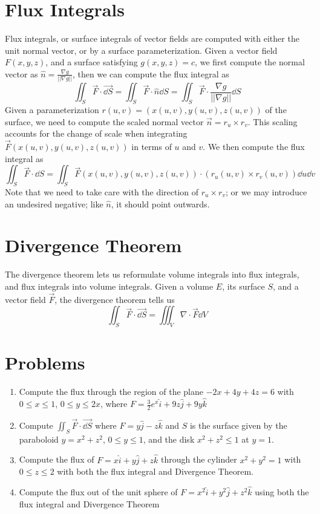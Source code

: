 \documentclass[letterpaper,11pt]{article}
\begin{document}
\section*{Flux Integrals}
Flux integrals, or surface integrals of vector fields are computed with either the unit normal vector, or by a surface parameterization.
Given a vector field $F(x, y, z)$, and a surface satisfying $g(x, y, z) = c$, we first compute the normal vector as
$\hat{n} = \frac{\nabla g}{||\nabla g||}$, then we can compute the flux integral as
$$
\iint_S \vec{F} \cdot \vec{\dd{S}} = \iint_S \vec{F} \cdot \hat{n} \dd{S} = \iint_S \vec{F} \cdot \frac{\nabla g}{||\nabla g||} \dd{S}
$$
Given a parameterization $r(u, v) = (x(u, v), y(u, v), z(u, v))$ of the surface, we need to compute the scaled normal vector
$\vec{n} = r_u \times r_v$.
This scaling accounts for the change of scale when integrating $\vec{F}(x(u, v), y(u, v), z(u, v))$ in terms of $u$ and $v$.
We then compute the flux integral as
$$
\iint_S \vec{F} \cdot \dd{S} = \iint_S \vec{F}(x(u, v), y(u, v), z(u, v)) \cdot (r_u(u, v) \times r_v(u, v)) \dd{u} \dd{v}
$$
Note that we need to take care with the direction of $r_u \times r_v$; or we may introduce an undesired negative;
like $\hat{n}$, it should point outwards.

\section*{Divergence Theorem}
The divergence theorem lets us reformulate volume integrals into flux integrals, and flux integrals into volume integrals.
Given a volume $E$, its surface $S$, and a vector field $\vec{F}$, the divergence theorem tells us
$$
\iint_S \vec{F} \cdot \vec{\dd{S}} = \iiint_V \nabla \cdot \vec{F} \dd{V}
$$
\section*{Problems}
\begin{enumerate}
\item Compute the flux through the region of the plane $-2 x + 4 y + 4 z = 6$ with $0 \leq x \leq 1$, $0 \leq y \leq 2 x$,
  where $F = \frac{3}{2} e^{x} \hat{i} + 9 z \hat{j} + 9 y \hat{k}$
\newpage
\item Compute $\iint_S \vec{F} \cdot \vec{\dd{S}}$ where $F = y \hat{j} - z \hat{k}$ and $S$ is the surface given by the paraboloid
  $y = x^2 + z^2$, $0 \leq y \leq 1$, and the disk $x^2 + z^2 \leq 1$ at $y = 1$.
\newpage
\item Compute the flux of $F = x \hat{i} + y \hat{j} + z \hat{k}$ through the cylinder $x^2 + y^2 = 1$ with $0 \leq z \leq 2$ with both the flux integral and Divergence Theorem.
\newpage
\item Compute the flux out of the unit sphere of $F = x^2 \hat{i} + y^2 \hat{j} + z^2 \hat{k}$ using both the flux integral and Divergence Theorem
\end{enumerate}
\end{document}
